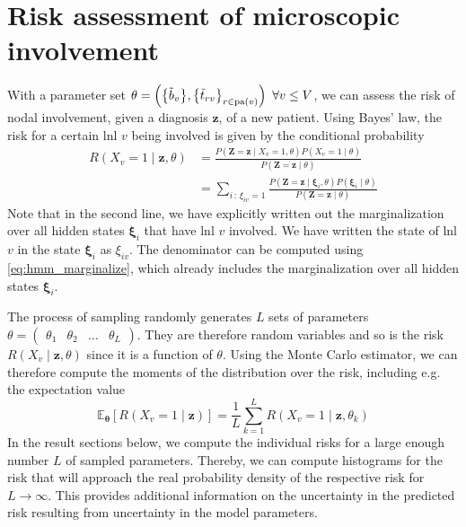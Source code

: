 \documentclass[\relativeRoot/main.tex]{subfiles}
\begin{document}
\section{Risk assessment of microscopic involvement}
\label{sec:unilateral:risk_assessment}

With a parameter set $\theta = \left( \big\{ \Tilde{b}_v \big\}, \big\{ \Tilde{t}_{rv} \big\}_{r \in \operatorname{pa}(v)} \right) \ \forall v \leq V$, we can assess the risk of nodal involvement, given a diagnosis $\mathbf{z}$, of a new patient. Using Bayes’ law, the risk for a certain \gls{lnl} $v$ being involved is given by the conditional probability
%
\begin{equation} \label{eq:unilateral:risk_assessment:risk}
    \begin{aligned}
        R \left( X_v=1 \mid \mathbf{z}, \theta \right) 
        &= \frac{P \left( \mathbf{Z}=\mathbf{z} \mid X_v=1, \theta \right) P \left( X_v=1 \mid \theta \right)}{P \left( \mathbf{Z}=\mathbf{z} \mid \theta \right)} \\
        &= \sum_{i\,:\,\xi_{iv}=1}{\frac{P \left( \mathbf{Z}=\mathbf{z} \mid \boldsymbol{\xi}_i , \theta \right) P \left( \boldsymbol{\xi}_i \mid \theta \right)}{P \left( \mathbf{Z}=\mathbf{z} \mid \theta \right)}}
    \end{aligned}
\end{equation}
%
Note that in the second line, we have explicitly written out the marginalization over all hidden states $\boldsymbol{\xi}_i$ that have \gls{lnl} $v$ involved. We have written the state of \gls{lnl} $v$ in the state $\boldsymbol{\xi}_i$ as $\xi_{iv}$. The denominator can be computed using \cref{eq:hmm_marginalize}, which already includes the marginalization over all hidden states $\boldsymbol{\xi}_i$.

The process of sampling randomly generates $L$ sets of parameters $\theta = \begin{pmatrix} \theta_1 & \theta_2 & \ldots & \theta_L \end{pmatrix}$. They are therefore random variables and so is the risk $R \left( X_v \mid \mathbf{z}, \theta \right)$ since it is a function of $\theta$. Using the Monte Carlo estimator, we can therefore compute the moments of the distribution over the risk, including e.g. the expectation value
%
\begin{equation}
    \mathbb{E}_{\boldsymbol{\theta}} \left[ R \left( X_v = 1 \mid \mathbf{z} \right) \right] = \frac{1}{L} \sum_{k=1}^{L}{R \left( X_v = 1 \mid \mathbf{z}, \theta_k \right)}
\end{equation}
%
In the result sections below, we compute the individual risks for a large enough number $L$ of sampled parameters. Thereby, we can compute histograms for the risk that will approach the real probability density of the respective risk for $L \rightarrow \infty$. This provides additional information on the uncertainty in the predicted risk resulting from uncertainty in the model parameters.
\end{document}

